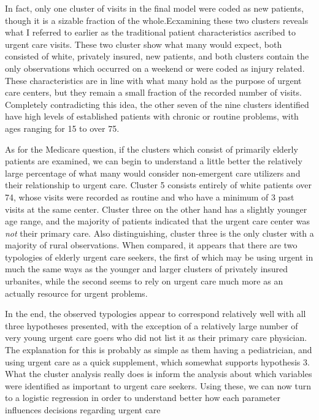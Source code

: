 \documentclass[12pt,twoside]{reedthesis}
\begin{document}
  \doublespacing
  
  In fact, only one cluster of visits in the final model were coded as new
  patients, though it is a sizable fraction of the whole.Ecxamining these
  two clusters reveals what I referred to earlier as the traditional
  patient characteristics ascribed to urgent care visits. These two
  cluster show what many would expect, both consisted of white, privately
  insured, new patients, and both clusters contain the only observations
  which occurred on a weekend or were coded as injury related. These
  characteristics are in line with what many hold as the purpose of urgent
  care centers, but they remain a small fraction of the recorded number of
  visits. Completely contradicting this idea, the other seven of the nine
  clusters identified have high levels of established patients with
  chronic or routine problems, with ages ranging for 15 to over 75.
  
  As for the Medicare question, if the clusters which consist of primarily
  elderly patients are examined, we can begin to understand a little
  better the relatively large percentage of what many would consider
  non-emergent care utilizers and their relationship to urgent care.
  Cluster 5 consists entirely of white patients over 74, whose visits were
  recorded as routine and who have a minimum of 3 past visits at the same
  center. Cluster three on the other hand has a slightly younger age
  range, and the majority of patients indicated that the urgent care
  center was \emph{not} their primary care. Also distinguishing, cluster
  three is the only cluster with a majority of rural observations. When
  compared, it appears that there are two typologies of elderly urgent
  care seekers, the first of which may be using urgent in much the same
  ways as the younger and larger clusters of privately insured urbanites,
  while the second seems to rely on urgent care much more as an actually
  resource for urgent problems.
  
  In the end, the observed typologies appear to correspond relatively well
  with all three hypotheses presented, with the exception of a relatively
  large number of very young urgent care goers who did not list it as
  their primary care physician. The explanation for this is probably as
  simple as them having a pediatrician, and using urgent care as a quick
  supplement, which somewhat supports hypothesis 3. What the cluster
  analysis really does is inform the analysis about which variables were
  identified as important to urgent care seekers. Using these, we can now
  turn to a logistic regression in order to understand better how each
  parameter influences decisions regarding urgent care
  
\end{document}
